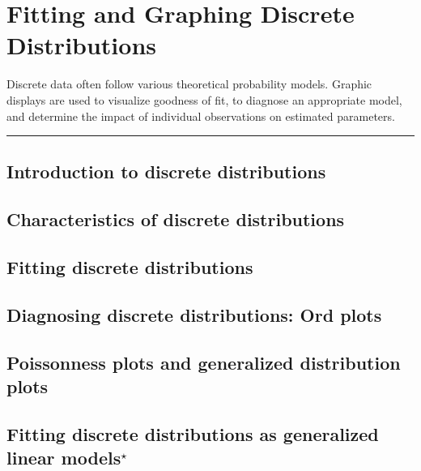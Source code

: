 \documentclass[10pt]{book}
\newcommand{\chapterprelude}[1]{%
\textsf{#1}
\par\noindent
\rule{\textwidth}{0.4pt}
}
\newcommand{\hard}{$^\star$\xspace}
\begin{document}
\chapter{Fitting and Graphing Discrete Distributions}\label{ch:discrete}


\savebox{}


\chapterprelude{%
Discrete data often follow various theoretical probability models.
Graphic displays are used to visualize goodness of fit,
to diagnose an appropriate model, and determine the impact of
individual observations on estimated parameters.
}

\section{Introduction to discrete distributions}\label{sec:discrete-intro}
\blindtext
\section{Characteristics of  discrete distributions}\label{sec:discrete-distrib}
\section{Fitting discrete distributions}\label{sec:discrete-fit}
\section{Diagnosing discrete distributions: Ord plots}\label{sec:discrete-ord}
\section{Poissonness plots and generalized distribution plots}\label{sec:discrete-Poissonness}
\section{Fitting discrete distributions as generalized linear models\hard}\label{sec:fitglm}
\end{document}
